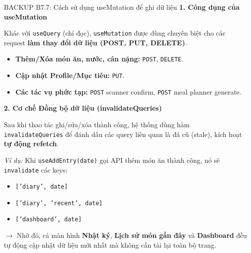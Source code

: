 \documentclass[10pt, aspectratio=169]{beamer}
\begin{document}
\begin{frame}[fragile, label=b7_7]{BACKUP B7.7: Cách sử dụng useMutation để ghi dữ liệu}
\hypertarget{b7_7_target}{}
    \textbf{1. Công dụng của useMutation}
    \vspace{0.1cm}
    
    Khác với \texttt{useQuery} (chỉ đọc), \texttt{useMutation} được dùng chuyên biệt cho các request \textbf{làm thay đổi dữ liệu (POST, PUT, DELETE)}.
    
    \begin{itemize}
        \item \textbf{Thêm/Xóa món ăn, nước, cân nặng:} \texttt{POST}, \texttt{DELETE}.
        \item \textbf{Cập nhật Profile/Mục tiêu:} \texttt{PUT}.
        \item \textbf{Các tác vụ phức tạp:} \texttt{POST} scanner confirm, \texttt{POST} meal planner generate.
    \end{itemize}

    \vspace{0.2cm}
    \textbf{2. Cơ chế Đồng bộ dữ liệu (invalidateQueries)}
    \vspace{0.1cm}
    
    Sau khi thao tác ghi/sửa/xóa thành công, hệ thống dùng hàm \texttt{invalidateQueries} để đánh dấu các query liên quan là đã cũ (stale), kích hoạt \textbf{tự động refetch}.
    
    \textit{Ví dụ:} Khi \texttt{useAddEntry(date)} gọi API thêm món ăn thành công, nó sẽ \texttt{invalidate} các keys:
    \begin{itemize}
        \item \texttt{['diary', date]}
        \item \texttt{['diary', 'recent', date]}
        \item \texttt{['dashboard', date]}
    \end{itemize}
    $\rightarrow$ Nhờ đó, cả màn hình \textbf{Nhật ký}, \textbf{Lịch sử món gần đây} và \textbf{Dashboard} đều tự động cập nhật dữ liệu mới nhất mà không cần tải lại toàn bộ trang.
\end{frame}
\end{document}
